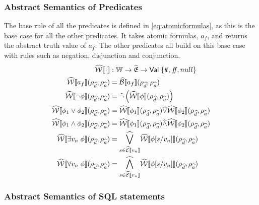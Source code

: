 \subsubsection{Abstract Semantics of Predicates}
The base rule of all the predicates is defined in \autoref{eq:atomicformulas}, as this is the base case for all the other predicates.
It takes atomic formulas, $a_f$, and returns the abstract truth value of $a_f$.
The other predicates all build on this base case with rules such as negation, disjunction and conjunction.
\begin{align}
    \abspredsem{\cdot} &: \mathbb{W} \rightarrow \ab{\mathfrak{E}} \rightarrow \mathsf{Val} \; \{\true, \false, \mnull\} \\ \label{eq:atomicformulas}
    \abspredsem{a_f}(\rho_{\ab{d}}, \rho_{\ab{a}}) &= \absboolsem{a_f}(\rho_{\ab{d}}, \rho_{\ab{a}}) \\
    \abspredsem{\neg \phi}(\rho_{\ab{d}}, \rho_{\ab{a}}) &= \ab{\neg} \left( \abspredsem{\phi}(\rho_{\ab{d}}, \rho_{\ab{a}}) \right) \\
    \abspredsem{\phi_1 \lor \phi_2}(\rho_{\ab{d}}, \rho_{\ab{a}}) &= \abspredsem{\phi_1}(\rho_{\ab{d}}, \rho_{\ab{a}}) \ab{\lor} \abspredsem{\phi_2}(\rho_{\ab{d}}, \rho_{\ab{a}}) \\
    \abspredsem{\phi_1 \land \phi_2}(\rho_{\ab{d}}, \rho_{\ab{a}}) &= \abspredsem{\phi_1}(\rho_{\ab{d}}, \rho_{\ab{a}}) \ab{\land} \abspredsem{\phi_2}(\rho_{\ab{d}}, \rho_{\ab{a}}) \\
    \abspredsem{\exists v_n \; \phi}(\rho_{\ab{d}}, \rho_{\ab{a}}) &= \underset{s \in \absexpsem{v_n}}{\ab{\bigvee}} \abspredsem{\phi[s/v_n]}(\rho_{\ab{d}}, \rho_{\ab{a}}) \\
    \abspredsem{\forall v_n \; \phi}(\rho_{\ab{d}}, \rho_{\ab{a}}) &= \underset{s \in \absexpsem{v_n}}{\ab{\bigwedge}} \abspredsem{\phi[s/v_n]}(\rho_{\ab{d}}, \rho_{\ab{a}})
\end{align}

\subsubsection{Abstract Semantics of SQL statements}

